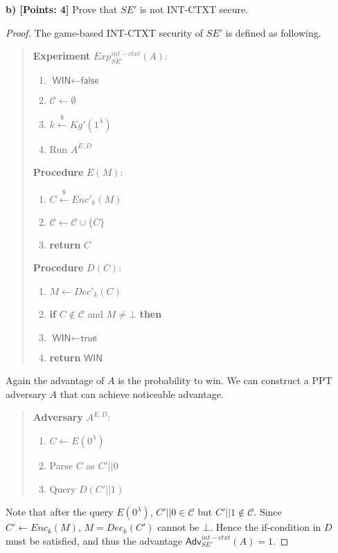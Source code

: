 \documentclass[12pt]{article}
\newcommand{\getsr}{\stackrel{\$}{\gets}}
\newcommand{\Adv}{\textsf{Adv}}
\newcommand{\tab}{\hspace{0.3in}}
\newcommand{\WIN}{\textsf{WIN}}
\newcommand{\true}{\textsf{true}}
\newcommand{\false}{\textsf{false}}
\newcommand{\C}{\mathcal{C}}
\theoremstyle{definition}
\begin{document}
{\bf b) [Points: 4]} Prove that $SE'$ is not INT-CTXT secure.
\begin{proof}
The game-based INT-CTXT security of $SE'$ is defined as following.
\begin{quote}
\begin{minipage}[t]{0.35\textwidth}
{\bf Experiment} $Exp_{SE'}^{int-ctxt}(A)$:
\begin{enumerate}
\item $\WIN \gets \false$
\item $\C \gets \emptyset$
\item $k \getsr Kg'(1^\lambda)$
\item Run $A^{E,D}$
\end{enumerate}
\end{minipage}
\begin{minipage}[t]{0.5\textwidth}
{\bf Procedure} $E(M)$:
\begin{enumerate}
\item $C \getsr Enc'_k(M)$
\item $\C \gets \C \cup \{C\}$
\item {\bf return} $C$
\end{enumerate}
\end{minipage}

\begin{minipage}[t]{0.5\textwidth}
{\bf Procedure} $D(C)$:
\begin{enumerate}
\item $M \gets Dec'_k(C)$
\item {\bf if} $C \not\in \C$ and $M \not=\bot$ {\bf then}
\item \tab $\WIN \gets \true$
\item {\bf return} $\WIN$
\end{enumerate}
\end{minipage}
\end{quote}
Again the advantage of $A$ is the probability to win. We can construct a PPT adversary $A$ that can achieve noticeable advantage.
\begin{quote}
{\bf Adversary} $A^{E,D}$:
\begin{enumerate}
\item $C \gets E(0^\lambda)$
\item Parse $C$ as $C'||0$
\item Query $D(C'||1)$
\end{enumerate}
\end{quote}
Note that after the query $E(0^\lambda)$, $C'||0 \in \C$ but $C'||1 \not\in \C$. Since $C' \gets Enc_k(M)$, $M = Dec_k(C')$ cannot be $\bot$. Hence the if-condition in $D$ must be satisfied, and thus the advantage $\Adv_{SE'}^{int-ctxt}(A) = 1$.
\end{proof}
\end{document}

